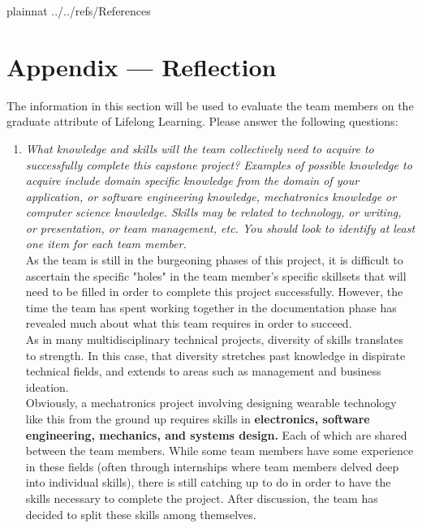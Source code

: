 \documentclass[12pt]{article}
\begin{document}
 {plainnat}
 {../../refs/References}
\newpage
\section*{Appendix --- Reflection}

The information in this section will be used to evaluate the team members on the
graduate attribute of Lifelong Learning.  Please answer the following questions:

\begin{enumerate}
  \item \textit{What knowledge and skills will the team collectively need to acquire to
        successfully complete this capstone project?  Examples of possible knowledge
        to acquire include domain specific knowledge from the domain of your
        application, or software engineering knowledge, mechatronics knowledge or
        computer science knowledge.  Skills may be related to technology, or writing,
        or presentation, or team management, etc.  You should look to identify at
        least one item for each team member.}\\

	As the team is still in the burgeoning phases of this project, it is difficult to ascertain the specific "holes" in the team member's specific skillsets that will need to be filled in order to complete this project successfully. However, the time the team has spent working together in the documentation phase has revealed much about what this team requires in order to succeed. \\

As in many multidisciplinary technical projects, diversity of skills translates to strength. In this case, that diversity stretches past knowledge in dispirate technical fields, and extends to areas such as management and business ideation.\\

Obviously, a mechatronics project involving designing wearable technology like this from the ground up requires skills in \textbf{electronics, software engineering, mechanics, and systems design.} Each of which are shared between the team members. While some team members have some experience in these fields (often through internships where team members delved deep into individual skills), there is still catching up to do in order to have the skills necessary to complete the project. After discussion, the team has decided to split these skills among themselves.\\


\end{enumerate}
\end{document}
